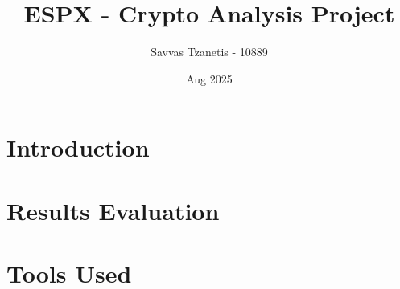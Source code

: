 \documentclass[12pt]{report}
\title{\textbf{ESPX - Crypto Analysis Project}}
\author{Savvas Tzanetis - 10889}
\date{Aug 2025}
\begin{document}
\maketitle

\chapter{Introduction}

\chapter{Results Evaluation}

\chapter{Tools Used}
\end{document}

